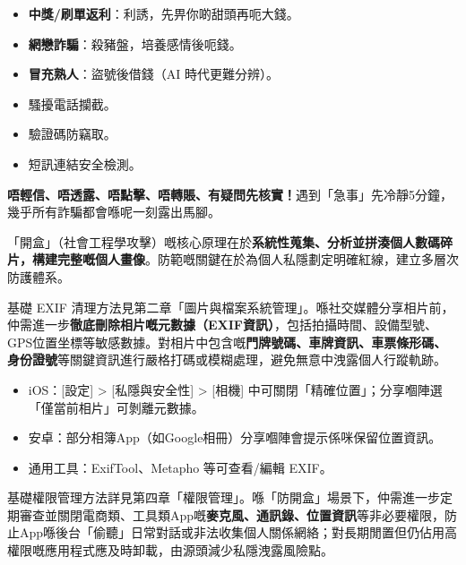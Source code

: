 
\begin{itemize}
  \item \textbf{中獎/刷單返利}：利誘，先畀你啲甜頭再呃大錢。
  \item \textbf{網戀詐騙}：殺豬盤，培養感情後呃錢。
  \item \textbf{冒充熟人}：盜號後借錢（AI 時代更難分辨）。
\end{itemize}


\begin{itemize}
  \item 騷擾電話攔截。
  \item 驗證碼防竊取。
  \item 短訊連結安全檢測。
\end{itemize}


\textbf{唔輕信、唔透露、唔點擊、唔轉賬、有疑問先核實！}遇到「急事」先冷靜5分鐘，幾乎所有詐騙都會喺呢一刻露出馬腳。


「開盒」（社會工程學攻擊）嘅核心原理在於\textbf{系統性蒐集、分析並拼湊個人數碼碎片，構建完整嘅個人畫像}。防範嘅關鍵在於為個人私隱劃定明確紅線，建立多層次防護體系。


基礎 EXIF 清理方法見第二章「圖片與檔案系統管理」。喺社交媒體分享相片前，仲需進一步\textbf{徹底刪除相片嘅元數據（EXIF資訊）}，包括拍攝時間、設備型號、GPS位置坐標等敏感數據。對相片中包含嘅\textbf{門牌號碼、車牌資訊、車票條形碼、身份證號}等關鍵資訊進行嚴格打碼或模糊處理，避免無意中洩露個人行蹤軌跡。

\begin{itemize}
  \item iOS：[設定] > [私隱與安全性] > [相機] 中可關閉「精確位置」；分享嗰陣選「僅當前相片」可剝離元數據。
  \item 安卓：部分相簿App（如Google相冊）分享嗰陣會提示係咪保留位置資訊。
  \item 通用工具：ExifTool、Metapho 等可查看/編輯 EXIF。
\end{itemize}


基礎權限管理方法詳見第四章「權限管理」。喺「防開盒」場景下，仲需進一步定期審查並關閉電商類、工具類App嘅\textbf{麥克風、通訊錄、位置資訊}等非必要權限，防止App喺後台「偷聽」日常對話或非法收集個人關係網絡；對長期閒置但仍佔用高權限嘅應用程式應及時卸載，由源頭減少私隱洩露風險點。

